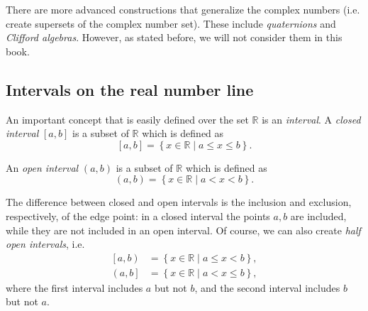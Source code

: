 There are more advanced constructions that generalize the complex numbers (i.e. create supersets of the complex number set). These include \emph{quaternions} and \emph{Clifford algebras}. However, as stated before, we will not consider them in this book.

\subsection{Intervals on the real number line}
An important concept that is easily defined over the set $\mathbb{R}$ is an \emph{interval}. A \emph{closed interval} $\left[ a,b \right]$ is a subset of $\mathbb{R}$ which is defined as
\begin{equation}
	\left[ a,b \right] = \left\{ x\in\mathbb{R} \mid a\leq x\leq b \right\}.
	\label{eq:closed_interval}
\end{equation}

An \emph{open interval} $\left( a,b \right)$ is a subset of $\mathbb{R}$ which is defined as
\begin{equation}
	\left( a,b \right) = \left\{ x\in\mathbb{R} \mid a<x<b \right\}.
	\label{eq:open_interval}
\end{equation}

The difference between closed and open intervals is the inclusion and exclusion, respectively, of the edge point: in a closed interval the points $a,b$ are included, while they are not included in an open interval. Of course, we can also create \emph{half open intervals}, i.e.
\begin{align}
	\left[ a,b \right) &= \left\{ x\in\mathbb{R} \mid a\leq x < b \right\},\nonumber\\
	\left( a,b \right] &= \left\{ x\in\mathbb{R} \mid a < x\leq b \right\},
	\label{eq:half_open_intervals}
\end{align}
where the first interval includes $a$ but not $b$, and the second interval includes $b$ but not $a$.

